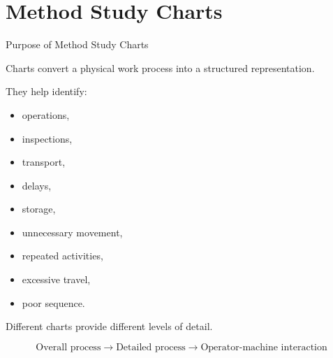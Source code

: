 \documentclass[aspectratio=169,10pt]{beamer}
\begin{document}

\section{Method Study Charts}

\begin{frame}[shrink=18]{Purpose of Method Study Charts}
\small

Charts convert a physical work process into a structured representation.

They help identify:

\begin{itemize}
    \item operations,
    \item inspections,
    \item transport,
    \item delays,
    \item storage,
    \item unnecessary movement,
    \item repeated activities,
    \item excessive travel,
    \item poor sequence.
\end{itemize}

\vspace{5pt}

Different charts provide different levels of detail.

\[
\boxed{
\text{Overall process}
\rightarrow
\text{Detailed process}
\rightarrow
\text{Operator-machine interaction}
}
\]

\end{frame}

\end{document}
